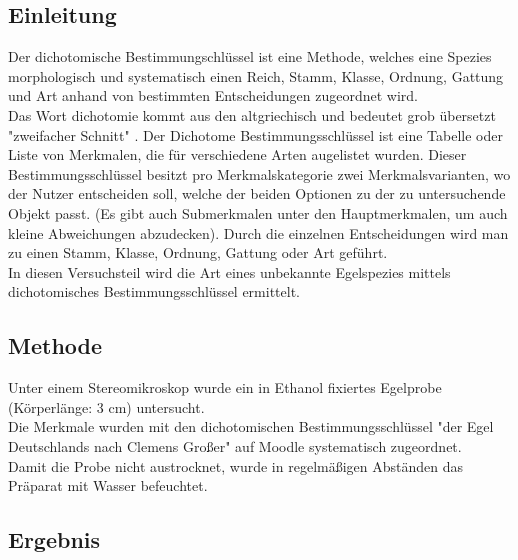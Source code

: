 \documentclass[oneside,10pt,a4paper]{report}
\begin{document}
			\subsection{Einleitung}
				Der dichotomische Bestimmungschlüssel ist eine Methode, welches eine Spezies morphologisch und systematisch einen Reich, Stamm, Klasse, Ordnung, Gattung und Art anhand von bestimmten Entscheidungen zugeordnet wird.\\
				Das Wort dichotomie kommt aus den altgriechisch und bedeutet grob übersetzt "zweifacher Schnitt" \cite{wiki_dichotom}.
				Der Dichotome Bestimmungsschlüssel ist eine Tabelle oder Liste von Merkmalen, die für verschiedene Arten augelistet wurden. Dieser Bestimmungsschlüssel besitzt pro Merkmalskategorie zwei Merkmalsvarianten, wo der Nutzer entscheiden soll, welche der beiden Optionen zu der zu untersuchende Objekt passt. (Es gibt auch Submerkmalen unter den Hauptmerkmalen, um auch kleine Abweichungen abzudecken)\cite{dichotomer_schlüssel}. Durch die einzelnen Entscheidungen wird man zu einen Stamm, Klasse, Ordnung, Gattung oder Art geführt.\\
				In diesen Versuchsteil wird die Art eines unbekannte Egelspezies mittels dichotomisches Bestimmungsschlüssel ermittelt.
			
			\subsection{Methode}
				Unter einem Stereomikroskop wurde ein in Ethanol fixiertes Egelprobe (Körperlänge: 3 cm) untersucht.\\
				Die Merkmale wurden mit den dichotomischen Bestimmungsschlüssel "der Egel Deutschlands nach Clemens Großer" auf Moodle systematisch zugeordnet.\\
				Damit die Probe nicht austrocknet, wurde in regelmäßigen Abständen das Präparat mit Wasser befeuchtet.
			
			\subsection{Ergebnis}
			
\end{document}
